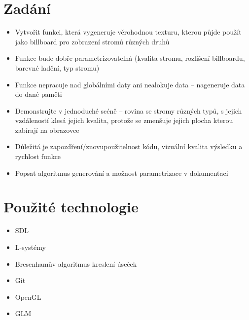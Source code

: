 \documentclass[11pt,a4paper]{article}
\begin{document}
\titlepageandcontents

\section{Zadání}

%

\begin{itemize}
\item Vytvořit funkci, která vygeneruje věrohodnou texturu, kterou půjde použít jako billboard pro zobrazení stromů různých druhů
\item Funkce bude dobře parametrizovatelná (kvalita stromu, rozlišení billboardu, barevné ladění, typ stromu)
\item Funkce nepracuje nad globálními daty ani nealokuje data -- nageneruje data do dané paměti
\item Demonstrujte v jednoduché scéně -- rovina se stromy různých typů, s jejich vzdáleností klesá jejich kvalita, protože se zmenšuje jejich plocha kterou zabírají na obrazovce
\item Důležitá je zapozdření/znovupoužitelnost kódu, vizuální kvalita výsledku a rychlost funkce
\item Popsat algoritmus generování a možnost parametrizace v dokumentaci
\end{itemize}

\section{Použité technologie}

%

\begin{itemize}
\item SDL
\item L-systémy
\item Bresenhamův algoritmus kreslení úseček
\item Git
\item OpenGL
\item GLM
\end{itemize}
\end{document}
